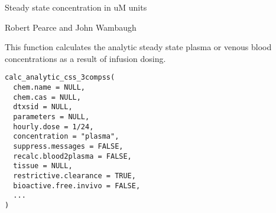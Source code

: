 \documentclass[a4paper]{book}
\begin{document}
%
\begin{Value}
Steady state concentration in uM units
\end{Value}
%
\begin{Author}\relax
Robert Pearce and John Wambaugh
\end{Author}
%
\begin{Description}\relax
This function calculates the analytic steady state plasma or venous blood 
concentrations as a result of infusion dosing.
\end{Description}
%
\begin{Usage}
\begin{verbatim}
calc_analytic_css_3compss(
  chem.name = NULL,
  chem.cas = NULL,
  dtxsid = NULL,
  parameters = NULL,
  hourly.dose = 1/24,
  concentration = "plasma",
  suppress.messages = FALSE,
  recalc.blood2plasma = FALSE,
  tissue = NULL,
  restrictive.clearance = TRUE,
  bioactive.free.invivo = FALSE,
  ...
)
\end{verbatim}
\end{Usage}
%
\end{document}
